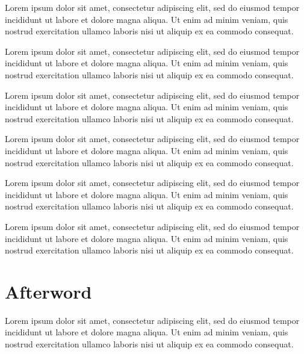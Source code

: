 \documentclass{book}
\begin{document}
Lorem ipsum dolor sit amet, consectetur adipiscing elit, sed do eiusmod tempor incididunt ut labore et dolore magna aliqua. Ut enim ad minim veniam, quis nostrud exercitation ullamco laboris nisi ut aliquip ex ea commodo consequat.

Lorem ipsum dolor sit amet, consectetur adipiscing elit, sed do eiusmod tempor incididunt ut labore et dolore magna aliqua. Ut enim ad minim veniam, quis nostrud exercitation ullamco laboris nisi ut aliquip ex ea commodo consequat.

Lorem ipsum dolor sit amet, consectetur adipiscing elit, sed do eiusmod tempor incididunt ut labore et dolore magna aliqua. Ut enim ad minim veniam, quis nostrud exercitation ullamco laboris nisi ut aliquip ex ea commodo consequat.

Lorem ipsum dolor sit amet, consectetur adipiscing elit, sed do eiusmod tempor incididunt ut labore et dolore magna aliqua. Ut enim ad minim veniam, quis nostrud exercitation ullamco laboris nisi ut aliquip ex ea commodo consequat.

Lorem ipsum dolor sit amet, consectetur adipiscing elit, sed do eiusmod tempor incididunt ut labore et dolore magna aliqua. Ut enim ad minim veniam, quis nostrud exercitation ullamco laboris nisi ut aliquip ex ea commodo consequat.

Lorem ipsum dolor sit amet, consectetur adipiscing elit, sed do eiusmod tempor incididunt ut labore et dolore magna aliqua. Ut enim ad minim veniam, quis nostrud exercitation ullamco laboris nisi ut aliquip ex ea commodo consequat.

\backmatter
\chapter{Afterword}
Lorem ipsum dolor sit amet, consectetur adipiscing elit, sed do eiusmod tempor incididunt ut labore et dolore magna aliqua. Ut enim ad minim veniam, quis nostrud exercitation ullamco laboris nisi ut aliquip ex ea commodo consequat.
\end{document}
